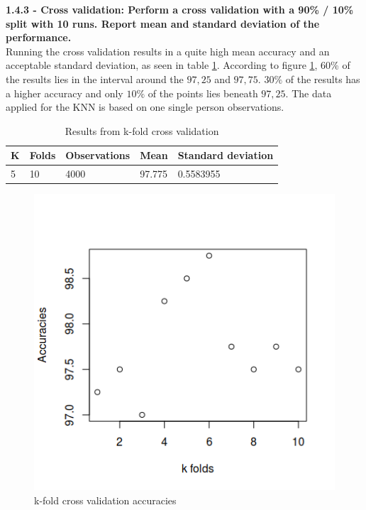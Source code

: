 \noindent
\textbf{1.4.3 - Cross validation: Perform a cross validation with a 90\% / 10\% split with 10 runs. Report mean and standard deviation of the performance.}\\

Running the cross validation results in a quite high mean accuracy and an acceptable standard deviation, as seen in table \ref{table:cvresult}. According to figure \ref{fig:cvplot}, 60\% of the results lies in the interval around the $97,25$ and $97,75$. $30\%$ of the results has a higher accuracy and only $10\%$ of the points lies beneath $97,25$. The data applied for the KNN is based on one single person observations.


\begin{table}[H]
\centering
\begin{tabular}{|l|l|l|l|l|}
\hline
K & Folds & Observations & Mean   & Standard deviation \\ \hline
5 & 10    & 4000         & 97.775 & 0.5583955          \\ \hline
\end{tabular}
\caption{Results from k-fold cross validation}
\label{table:cvresult}
\end{table}



\begin{figure}[H]
\centering
\includegraphics[scale=0.55]{Graphics/KNN/cvplot.png}
\caption{k-fold cross validation accuracies}
\label{fig:cvplot}
\end{figure}

